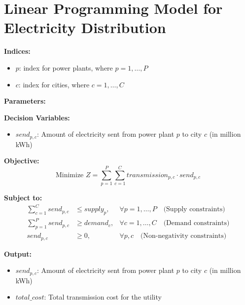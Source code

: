 \documentclass{article}
\begin{document}
\section*{Linear Programming Model for Electricity Distribution}

\textbf{Indices:}
\begin{itemize}
    \item $p$: index for power plants, where $p = 1, \ldots, P$
    \item $c$: index for cities, where $c = 1, \ldots, C$
\end{itemize}

\textbf{Parameters:}

\textbf{Decision Variables:}
\begin{itemize}
    \item $send_{p,c}$: Amount of electricity sent from power plant $p$ to city $c$ (in million kWh)
\end{itemize}

\textbf{Objective:}
\[
\text{Minimize } Z = \sum_{p=1}^{P} \sum_{c=1}^{C} transmission_{p,c} \cdot send_{p,c}
\]

\textbf{Subject to:}
\begin{align*}
\sum_{c=1}^{C} send_{p,c} & \leq supply_p, & \forall p = 1, \ldots, P \quad \text{(Supply constraints)} \\
\sum_{p=1}^{P} send_{p,c} & \geq demand_c, & \forall c = 1, \ldots, C \quad \text{(Demand constraints)} \\
send_{p,c} & \geq 0, & \forall p, c \quad \text{(Non-negativity constraints)}
\end{align*}

\textbf{Output:}
\begin{itemize}
    \item $send_{p,c}$: Amount of electricity sent from power plant $p$ to city $c$ (in million kWh)
    \item $total\_cost$: Total transmission cost for the utility
\end{itemize}
\end{document}
